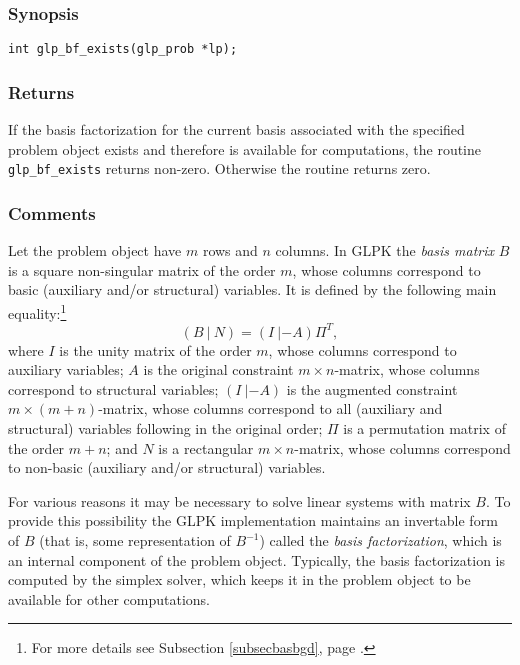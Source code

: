 \subsubsection*{Synopsis}

\begin{verbatim}
int glp_bf_exists(glp_prob *lp);
\end{verbatim}

\subsubsection*{Returns}

If the basis factorization for the current basis associated with the
specified problem object exists and therefore is available for
computations, the routine \verb|glp_bf_exists| returns non-zero.
Otherwise the routine returns zero.

\subsubsection*{Comments}

Let the problem object have $m$ rows and $n$ columns. In GLPK the
{\it basis matrix} $B$ is a square non-singular matrix of the order $m$,
whose columns correspond to basic (auxiliary and/or structural)
variables. It is defined by the following main
equality:\footnote{For more details see Subsection \ref{subsecbasbgd},
page \pageref{subsecbasbgd}.}
$$(B\ |\ N)=(I\ |-\!A)\Pi^T,$$
where $I$ is the unity matrix of the order $m$, whose columns correspond
to auxiliary variables; $A$ is the original constraint
$m\times n$-matrix, whose columns correspond to structural variables;
$(I\ |-\!A)$ is the augmented constraint\linebreak
$m\times(m+n)$-matrix, whose columns correspond to all (auxiliary and
structural) variables following in the original order; $\Pi$ is a
permutation matrix of the order $m+n$; and $N$ is a rectangular
$m\times n$-matrix, whose columns correspond to non-basic (auxiliary
and/or structural) variables.

For various reasons it may be necessary to solve linear systems with
matrix $B$. To provide this possibility the GLPK implementation
maintains an invertable form of $B$ (that is, some representation of
$B^{-1}$) called the {\it basis factorization}, which is an internal
component of the problem object. Typically, the basis factorization is
computed by the simplex solver, which keeps it in the problem object
to be available for other computations.

